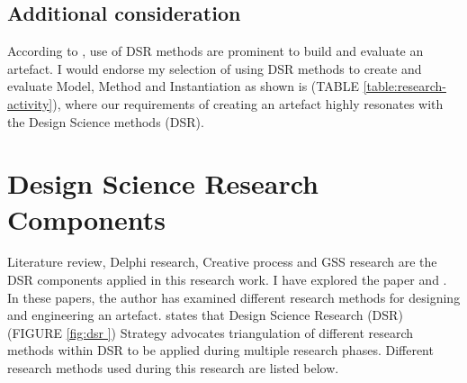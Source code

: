 \subsection{Additional consideration}

According to \cite{march1995design}, 
use of DSR methods are prominent to build and evaluate an artefact.
I would endorse my selection of using DSR methods 
to create and evaluate  Model, Method and Instantiation 
as shown is (TABLE \ref{table:research-activity}), 
where our requirements of creating an artefact 
highly resonates with the Design Science methods (DSR).


 \FloatBarrier

\section{Design Science Research Components}

Literature review, Delphi research, Creative process and 
GSS research are the DSR components applied in this research work.
I have explored the paper
\citep{bobbert2017defining} and  
\citep{bobbert2017exploring}. 
In these papers, the author has examined different research methods for designing and engineering an artefact. 
\cite{bobbert2017exploring} states that 
Design Science Research (DSR) (FIGURE \ref{fig:dsr }) 
Strategy advocates triangulation of different research methods 
within DSR to be applied during multiple research phases. 
Different research methods used during this research are listed below. 


